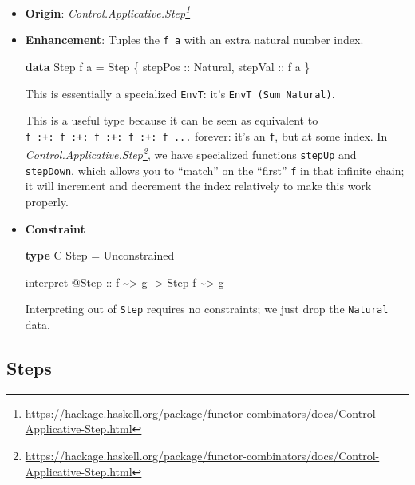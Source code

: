 \documentclass[]{article}
\newenvironment{Shaded}{}{}
\newcommand{\DataTypeTok}[1]{\textcolor[rgb]{0.56,0.13,0.00}{#1}}
\newcommand{\KeywordTok}[1]{\textcolor[rgb]{0.00,0.44,0.13}{\textbf{#1}}}
\newcommand{\NormalTok}[1]{#1}
\newcommand{\OperatorTok}[1]{\textcolor[rgb]{0.40,0.40,0.40}{#1}}
\newcommand{\OtherTok}[1]{\textcolor[rgb]{0.00,0.44,0.13}{#1}}
\renewcommand{\href}[2]{#2\footnote{\url{#1}}}
\begin{document}
\begin{itemize}
\item
  \textbf{Origin}:
  \emph{\href{https://hackage.haskell.org/package/functor-combinators/docs/Control-Applicative-Step.html}{Control.Applicative.Step}}
\item
  \textbf{Enhancement}: Tuples the \texttt{f\ a} with an extra natural number
  index.

\begin{Shaded}
\begin{Highlighting}[]
\KeywordTok{data} \DataTypeTok{Step}\NormalTok{ f a }\OtherTok{=} \DataTypeTok{Step}\NormalTok{ \{}\OtherTok{ stepPos ::} \DataTypeTok{Natural}\NormalTok{,}\OtherTok{ stepVal ::}\NormalTok{ f a \}}
\end{Highlighting}
\end{Shaded}

  This is essentially a specialized \texttt{EnvT}: it's
  \texttt{EnvT\ (Sum\ Natural)}.

  This is a useful type because it can be seen as equivalent to
  \texttt{f\ :+:\ f\ :+:\ f\ :+:\ f\ :+:\ f\ ...} forever: it's an \texttt{f},
  but at some index. In
  \emph{\href{https://hackage.haskell.org/package/functor-combinators/docs/Control-Applicative-Step.html}{Control.Applicative.Step}},
  we have specialized functions \texttt{stepUp} and \texttt{stepDown}, which
  allows you to ``match'' on the ``first'' \texttt{f} in that infinite chain; it
  will increment and decrement the index relatively to make this work properly.
\item
  \textbf{Constraint}

\begin{Shaded}
\begin{Highlighting}[]
\KeywordTok{type} \DataTypeTok{C} \DataTypeTok{Step} \OtherTok{=} \DataTypeTok{Unconstrained}

\NormalTok{interpret }\OperatorTok{@}\DataTypeTok{Step}
\OtherTok{    ::}\NormalTok{ f }\OperatorTok{\textasciitilde{}>}\NormalTok{ g}
    \OtherTok{{-}>} \DataTypeTok{Step}\NormalTok{ f }\OperatorTok{\textasciitilde{}>}\NormalTok{ g}
\end{Highlighting}
\end{Shaded}

  Interpreting out of \texttt{Step} requires no constraints; we just drop the
  \texttt{Natural} data.
\end{itemize}

\hypertarget{steps}{%
\subsection{Steps}\label{steps}}
\end{document}
